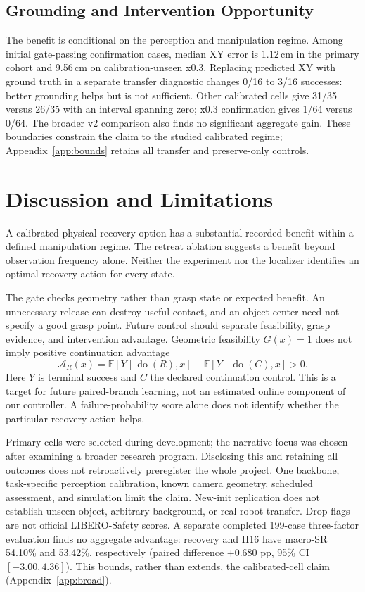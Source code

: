 \documentclass{article}
\begin{document}
\subsection{Grounding and Intervention Opportunity}
The benefit is conditional on the perception and manipulation regime.
Among initial gate-passing confirmation cases, median XY error is 1.12\,cm
in the primary cohort and 9.56\,cm on calibration-unseen x0.3.
Replacing predicted XY with ground truth in a separate transfer diagnostic
changes 0/16 to 3/16 successes: better grounding helps but is not sufficient.
Other calibrated cells give 31/35 versus 26/35 with an interval spanning zero;
x0.3 confirmation gives 1/64 versus 0/64. The broader v2 comparison also
finds no significant aggregate gain. These boundaries constrain the claim
to the studied calibrated regime; Appendix~\ref{app:bounds} retains all
transfer and preserve-only controls.

\section{Discussion and Limitations}
A calibrated physical recovery option has a substantial recorded benefit
within a defined manipulation regime. The retreat ablation suggests
a benefit beyond observation frequency alone.
Neither the experiment nor the localizer identifies an optimal recovery
action for every state.

The gate checks geometry rather than grasp state or expected benefit.
An unnecessary release can destroy useful contact, and an object center
need not specify a good grasp point.
Future control should separate feasibility, grasp evidence, and intervention
advantage. Geometric feasibility $G(x)=1$ does not imply positive
continuation advantage
\begin{equation}
\mathcal A_R(x)=\mathbb E[Y\mid\operatorname{do}(R),x]
              -\mathbb E[Y\mid\operatorname{do}(C),x]>0.
\label{eq:advantage}
\end{equation}
Here $Y$ is terminal success and $C$ the declared continuation control.
This is a target for future paired-branch learning, not an estimated online
component of our controller. A failure-probability score alone does not
identify whether the particular recovery action helps.

Primary cells were selected during development; the narrative focus was
chosen after examining a broader research program. Disclosing this and
retaining all outcomes does not retroactively preregister the whole project.
One backbone, task-specific perception calibration, known camera geometry,
scheduled assessment, and simulation limit the claim.
New-init replication does not establish unseen-object, arbitrary-background,
or real-robot transfer. Drop flags are not official LIBERO-Safety scores.
A separate completed 199-case three-factor evaluation finds no aggregate
advantage: recovery and H16 have macro-SR 54.10\% and 53.42\%, respectively
(paired difference +0.680 pp, 95\% CI $[-3.00,4.36]$).
This bounds, rather than extends, the calibrated-cell claim
(Appendix~\ref{app:broad}).
\end{document}

